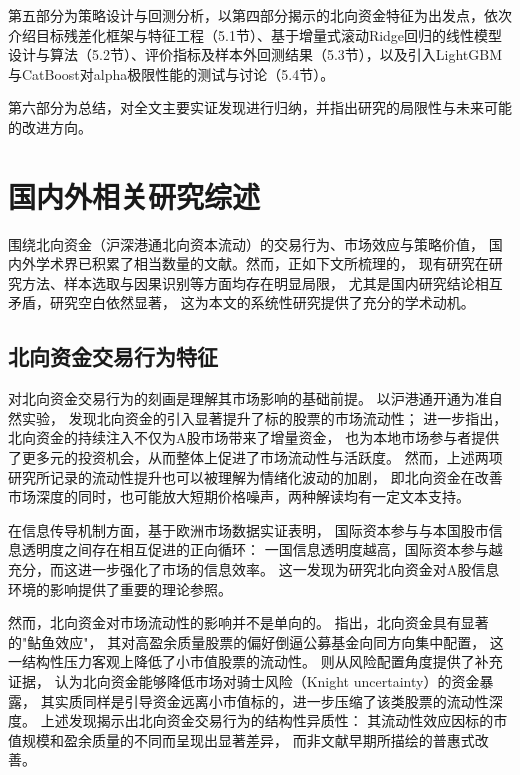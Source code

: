 \documentclass{article}
\begin{document}
第五部分为策略设计与回测分析，以第四部分揭示的北向资金特征为出发点，依次介绍目标残差化框架与特征工程（5.1节）、基于增量式滚动Ridge回归的线性模型设计与算法（5.2节）、评价指标及样本外回测结果（5.3节），以及引入LightGBM与CatBoost对alpha极限性能的测试与讨论（5.4节）。

第六部分为总结，对全文主要实证发现进行归纳，并指出研究的局限性与未来可能的改进方向。

\newpage
\section{国内外相关研究综述}

围绕北向资金（沪深港通北向资本流动）的交易行为、市场效应与策略价值，
国内外学术界已积累了相当数量的文献。然而，正如下文所梳理的，
现有研究在研究方法、样本选取与因果识别等方面均存在明显局限，
尤其是国内研究结论相互矛盾，研究空白依然显著，
这为本文的系统性研究提供了充分的学术动机。

\subsection{北向资金交易行为特征}

对北向资金交易行为的刻画是理解其市场影响的基础前提。
\cite{JTJJ202212008}以沪港通开通为准自然实验，
发现北向资金的引入显著提升了标的股票的市场流动性；
\cite{JRQH202109017}进一步指出，北向资金的持续注入不仅为A股市场带来了增量资金，
也为本地市场参与者提供了更多元的投资机会，从而整体上促进了市场流动性与活跃度。
然而，上述两项研究所记录的流动性提升也可以被理解为情绪化波动的加剧，
即北向资金在改善市场深度的同时，也可能放大短期价格噪声，两种解读均有一定文本支持。

在信息传导机制方面，\cite{TODEA201334}基于欧洲市场数据实证表明，
国际资本参与与本国股市信息透明度之间存在相互促进的正向循环：
一国信息透明度越高，国际资本参与越充分，而这进一步强化了市场的信息效率。
这一发现为研究北向资金对A股信息环境的影响提供了重要的理论参照。

然而，北向资金对市场流动性的影响并不是单向的。
\cite{ZYCY202303004}指出，北向资金具有显著的"鲇鱼效应"，
其对高盈余质量股票的偏好倒逼公募基金向同方向集中配置，
这一结构性压力客观上降低了小市值股票的流动性。
\cite{STYS20231207004}则从风险配置角度提供了补充证据，
认为北向资金能够降低市场对骑士风险（Knight uncertainty）的资金暴露，
其实质同样是引导资金远离小市值标的，进一步压缩了该类股票的流动性深度。
上述发现揭示出北向资金交易行为的结构性异质性：
其流动性效应因标的市值规模和盈余质量的不同而呈现出显著差异，
而非文献早期所描绘的普惠式改善。
\end{document}
